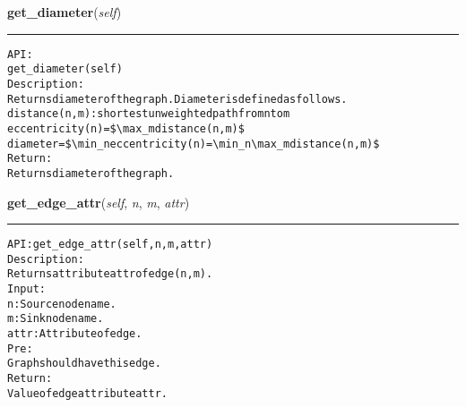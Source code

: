     \vspace{0.5ex}

\hspace{.8\funcindent}\begin{boxedminipage}{\funcwidth}

    \raggedright \textbf{get\_diameter}(\textit{self})

    \vspace{-1.5ex}

    \rule{\textwidth}{0.5\fboxrule}
\setlength{\parskip}{2ex}
\begin{alltt}

API:
    get\_diameter(self)
Description:
    Returns diameter of the graph. Diameter is defined as follows.
    distance(n,m): shortest unweighted path from n to m
    eccentricity(n) = \${\textbackslash}max \_m distance(n,m)\$
    diameter = \${\textbackslash}min \_n eccentricity(n) = {\textbackslash}min \_n {\textbackslash}max \_m distance(n,m)\$
Return:
    Returns diameter of the graph.
\end{alltt}

\setlength{\parskip}{1ex}
    \end{boxedminipage}

    \label{coinor:gimpy:graph:Graph:get_edge_attr}

    \vspace{0.5ex}

\hspace{.8\funcindent}\begin{boxedminipage}{\funcwidth}

    \raggedright \textbf{get\_edge\_attr}(\textit{self}, \textit{n}, \textit{m}, \textit{attr})

    \vspace{-1.5ex}

    \rule{\textwidth}{0.5\fboxrule}
\setlength{\parskip}{2ex}
\begin{alltt}

API: get\_edge\_attr(self, n, m, attr)
Description:
Returns attribute attr of edge (n,m).
Input:
    n: Source node name.
    m: Sink node name.
    attr: Attribute of edge.
Pre:
    Graph should have this edge.
Return:
    Value of edge attribute attr.
\end{alltt}

\setlength{\parskip}{1ex}
    \end{boxedminipage}

